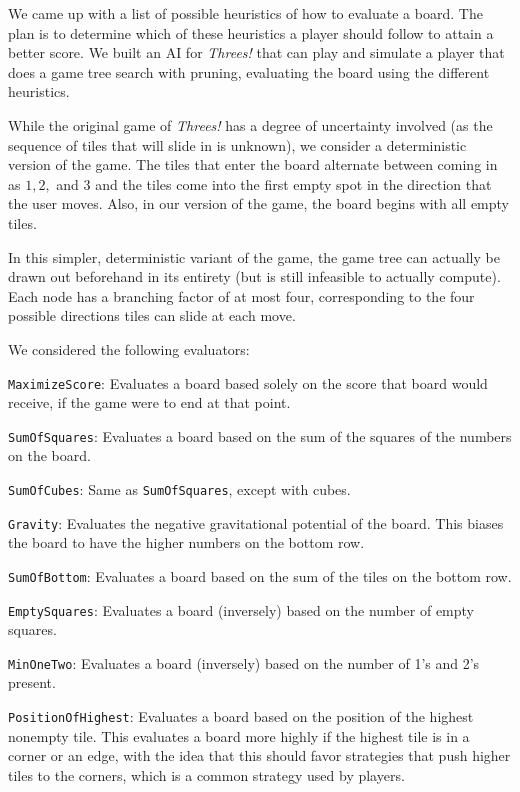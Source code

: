 \documentclass[11pt]{article}
\begin{document}
We came up with a list of possible heuristics of how to evaluate a board. The plan is to determine which of these heuristics a player should follow to attain a better score. We built an AI for \emph{Threes!} that can play and simulate a player that does a game tree search with pruning, evaluating the board using the different heuristics. 

While the original game of \emph{Threes!} has a degree of uncertainty involved (as the sequence of tiles that will slide in is unknown), we consider a deterministic version of the game. The tiles that enter the board alternate between coming in as $1, 2,$ and $3$ and the tiles come into the first empty spot in the direction that the user moves. Also, in our version of the game, the board begins with all empty tiles.

In this simpler, deterministic variant of the game, the game tree can actually be drawn out beforehand in its entirety (but is still infeasible to actually compute). Each node has a branching factor of at most four, corresponding to the four possible directions tiles can slide at each move.

We considered the following evaluators:

\texttt{MaximizeScore}: Evaluates a board based solely on the score that board would receive, if the game were to end at that point.

\texttt{SumOfSquares}: Evaluates a board based on the sum of the squares of the numbers on the board.

\texttt{SumOfCubes}: Same as \texttt{SumOfSquares}, except with cubes.

\texttt{Gravity}: Evaluates the negative gravitational potential of the board. This biases the board to have the higher numbers on the bottom row.

\texttt{SumOfBottom}: Evaluates a board based on the sum of the tiles on the bottom row.

\texttt{EmptySquares}: Evaluates a board (inversely) based on the number of empty squares.

\texttt{MinOneTwo}: Evaluates a board (inversely) based on the number of 1's and 2's present. 

\texttt{PositionOfHighest}: Evaluates a board based on the position of the highest nonempty tile. This evaluates a board more highly if the highest tile is in a corner or an edge, with the idea that this should favor strategies that push higher tiles to the corners, which is a common strategy used by players. 
\end{document}
